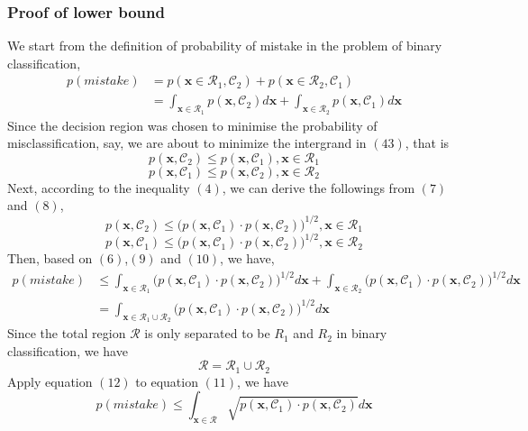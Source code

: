 \documentclass[11pt,a4paper]{article}
\newcommand{\htab}{\hspace*{0.63cm}}
\newcommand{\C}{\mathcal{C}}
\newcommand{\bx}{\textbf{x}}
\newcommand{\R}{\mathcal{R}}
\begin{document}
\subsubsection{Proof of lower bound}
\htab We start from the definition of probability of mistake in the problem of binary classification,
    \begin{equation}
    \begin{aligned}
    p(mistake) & = p(\bx \in \R_{1}, \C_{2}) + p(\bx \in \R_{2}, \C_{1}) \\
       & = \int_{\bx \in \R_{1}} p(\bx,\C_{2}) d\bx + \int_{\bx \in \R_{2}} p(\bx,\C_{1}) d\bx 
    \end{aligned}
    \end{equation}
\htab Since the decision region was chosen to minimise the probability of misclassification, say, we are about to minimize the intergrand in $(43)$, that is
    \begin{equation} p(\bx,\C_{2}) \leq p(\bx,\C_{1}) , \bx \in \R_{1}  \end{equation}
    \begin{equation} p(\bx,\C_{1}) \leq p(\bx,\C_{2}) , \bx \in \R_{2} \end{equation}
\htab Next, according to the inequality $(4)$, we can derive the followings from $(7)$ and $(8)$, 
    \begin{equation}
        p(\bx,\C_{2}) \leq \big(p(\bx,\C_{1}) \cdot p(\bx,\C_{2})\big)^{1/2} , \bx \in \R_{1}
    \end{equation}
    \begin{equation}
        p(\bx,\C_{1}) \leq \big(p(\bx,\C_{1}) \cdot p(\bx,\C_{2})\big)^{1/2} , \bx \in \R_{2}
    \end{equation}
\htab Then, based on $(6)$,$(9)$ and $(10)$, we have,
    \begin{equation}
    \begin{aligned}
    p(mistake)  
        & \leq \int_{\bx \in \R_{1}} \big(p(\bx,\C_{1}) \cdot p(\bx,\C_{2})\big)^{1/2} d\bx
            + \int_{\bx \in \R_{2}} \big(p(\bx,\C_{1}) \cdot p(\bx,\C_{2})\big)^{1/2} d\bx \\
        & = \int_{\bx \in \R_{1}\cup \R_{2}} \big(p(\bx,\C_{1}) \cdot p(\bx,\C_{2})\big)^{1/2} d\bx
    \end{aligned}
    \end{equation}
\htab Since the total region $\R$ is only separated to be $R_{1}$ and $R_{2}$ in binary classification, we have
    \begin{equation}    \R = \R_{1} \cup \R_{2}     \end{equation}
\htab Apply equation $(12)$ to equation $(11)$, we have
    \begin{equation}
        p(mistake) \leq \int_{\bx \in \R} \sqrt{p(\bx,\C_{1}) \cdot p(\bx,\C_{2})} d\bx 
    \end{equation}
\newpage
\end{document}

